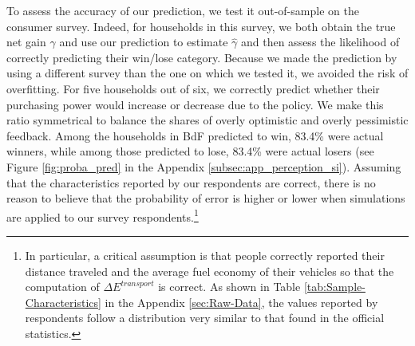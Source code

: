 \documentclass[12pt]{article} %
\begin{document}
To assess the accuracy of our prediction, we test it out-of-sample on the consumer survey. Indeed, for households in this survey, we both obtain the true net gain $\gamma$ and use our prediction to estimate $\widehat{\gamma}$ and then assess the likelihood of correctly predicting their win/lose category. Because we made the prediction by using a different survey than the one on which we tested it, we avoided the risk of overfitting. For five households out of six, we correctly predict whether their purchasing power would increase or decrease due to the policy. We make this ratio symmetrical to balance the shares of overly optimistic and overly pessimistic feedback. Among the households in BdF predicted to win, 83.4\% were actual winners, while among those predicted to lose, 83.4\% were actual losers (see Figure \ref{fig:proba_pred} in the Appendix \ref{subsec:app_perception_si}). Assuming that the characteristics reported by our respondents are correct, there is no reason to believe that the probability of error is higher or lower when simulations are applied to our survey respondents.\footnote{In particular, a critical assumption is that people correctly reported their distance traveled and the average fuel economy of their vehicles so that the computation of $\Delta E^{transport}$ is correct. As shown in Table \ref{tab:Sample-Characteristics} in the Appendix \ref{sec:Raw-Data}, the values reported by respondents follow a distribution very similar to that found in the official statistics.}


\end{document}
